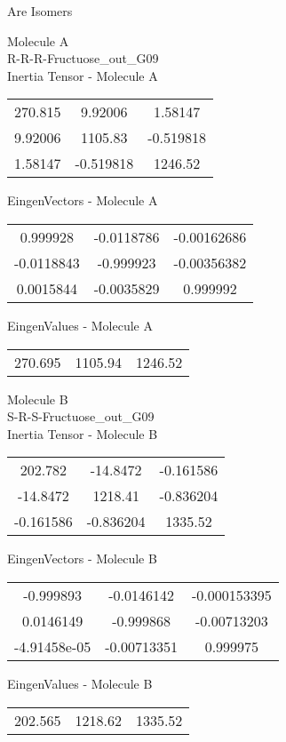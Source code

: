 \begin{center}
\vtab
\vtab
\textcolor{NavyBlue}{\Large Are Isomers}
\end{center}
\newpage
\begin{multicols}{2}
\begin{center}
Molecule A \\ 
R-R-R-Fructuose\_out\_G09
\\
Inertia Tensor - Molecule A \\
\vtab
\begin{tabular}{|c c c|}
270.815	 & 	9.92006	 & 	1.58147	 \\
9.92006	 & 	1105.83	 & 	-0.519818	 \\
1.58147	 & 	-0.519818	 & 	1246.52
\end{tabular}

\vtab
 EingenVectors - Molecule A     \\
\vtab
\begin{tabular}{|c c c|}
0.999928	 & 	-0.0118786	 & 	-0.00162686	 \\
-0.0118843	 & 	-0.999923	 & 	-0.00356382	 \\
0.0015844	 & 	-0.0035829	 & 	0.999992
\end{tabular}

\vtab
 EingenValues - Molecule A     \\
\vtab
\begin{tabular}{|c c c|}
270.695	 & 	1105.94	 & 	1246.52
\end{tabular}
\columnbreak

Molecule B \\ 
S-R-S-Fructuose\_out\_G09
\\
Inertia Tensor - Molecule B \\
\vtab
\begin{tabular}{|c c c|}
202.782	 & 	-14.8472	 & 	-0.161586	 \\
-14.8472	 & 	1218.41	 & 	-0.836204	 \\
-0.161586	 & 	-0.836204	 & 	1335.52
\end{tabular}

\vtab
 EingenVectors - Molecule B     \\
\vtab
\begin{tabular}{|c c c|}
-0.999893	 & 	-0.0146142	 & 	-0.000153395	 \\
0.0146149	 & 	-0.999868	 & 	-0.00713203	 \\
-4.91458e-05	 & 	-0.00713351	 & 	0.999975
\end{tabular}

\vtab
 EingenValues - Molecule B     \\
\vtab
\begin{tabular}{|c c c|}
202.565	 & 	1218.62	 & 	1335.52
\end{tabular}

\end{center}
\end{multicols}
